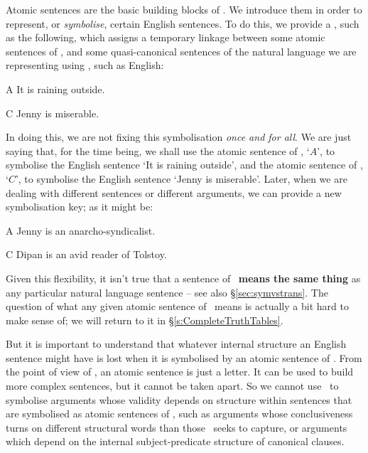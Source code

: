 Atomic sentences are the basic building blocks of \TFL. We introduce them in order to represent, or \emph{symbolise}, certain English sentences. To do this, we provide a , such as the following, which assigns a temporary linkage between some atomic sentences of \TFL, and some quasi-canonical sentences of the natural language we are representing using \TFL, such as English:
	\begin{ekey}
		\item[A] It is raining outside.
		\item[C] Jenny is miserable.
	\end{ekey}
In doing this, we are not fixing this symbolisation \emph{once and for all}. We are just saying that, for the time being, we shall use the atomic sentence of \TFL, `$A$', to symbolise the English sentence `It is raining outside', and the atomic sentence of \TFL, `$C$', to symbolise the English sentence `Jenny is miserable'. Later, when we are dealing with different sentences or different arguments, we can provide a new symbolisation key; as it might be:
	\begin{ekey}
		\item[A] Jenny is an anarcho-syndicalist.
		\item[C] Dipan is an avid reader of Tolstoy.
	\end{ekey}
Given this flexibility, it isn't true that a sentence of \TFL\ \textbf{means the same thing} as any particular natural language sentence – see also §\ref{sec:symvstrans}. The question of what any given atomic sentence of \TFL\ means is actually a bit hard to make sense of; we will return to it in §\ref{s:CompleteTruthTables}.


But it is important to understand that whatever internal structure an English sentence might have is lost when it is symbolised by an atomic sentence of \TFL. From the point of view of \TFL, an atomic sentence is just a letter. It can be used to build more complex sentences, but it cannot be taken apart. So we cannot use \TFL\ to symbolise arguments whose validity depends on structure within sentences that are symbolised as atomic sentences of \TFL, such as arguments whose conclusiveness turns on different structural words than those \TFL\ seeks to capture, or arguments which depend on the internal subject-predicate structure of canonical clauses.





